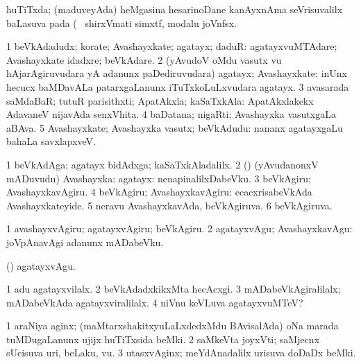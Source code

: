 \bentry
{}
\gl{\gu}
\bmng
huTiTxda; (maduveyAda) heMgasina hesarinoDane kanAyxnAma seVrisuvalilx baLasuva pada (\udA\  shirxVmati simxtf, modalu joVnfsx. 
\emng
\eentry

\bentry
{}
\gl{\nA}
\bmng
\bnum
\num{1} beVkAdadudx; korate; Avashayxkate; agatayx; daduR:  agatayxvuMTAdare; Avashayxkate idadxre; beVkAdare. 
\num{2} (yAvudoV oMdu vasutx \mo vu hAjarAgiruvudara yA adanunx paDediruvudara) agatayx; Avashayxkate:  inUnx hecucx baMDavALa patarxgaLanunx iTuTxkoLuLxvudara agatayx. 
\num{3} avasarada saMdaBaR; tutuR parisithxti; ApatAkxla; kaSaTxkAla:  ApatAkxlakekx AdavaneV nijavAda senxVhita. 
\num{4} baDatana; nigaRti; Avashayxka vasutxgaLa aBAva. 
\num{5} Avashayxkate; Avashayxka vasutx; beVkAdudu:  nananx agatayxgaLu bahaLa savxlapxveV. 
\enum
\emng

\noindent
\gl{\pagu}
\bmng
\bnum
\num{1}  beVkAdAga; agatayx bidAdxga; kaSaTxkAladalilx. 
\num{2}  (\pArxparx) (yAvudanonxV mADuvudu) Avashayxka: agatayx:  nenapinalilxDabeVku. 
\num{3}  beVkAgiru; AvashayxkavAgiru. 
\num{4}  beVkAgiru; AvashayxkavAgiru:  ecacxrisabeVkAda Avashayxkateyide. 
\num{5}  neravu AvashayxkavAda, beVkAgiruva. 
\num{6}  beVkAgiruva. 
\enum
\emng
\eentry

\bentry
{}
\gl{\sakirx}
\bmng
\bnum
\num{1} avashayxvAgiru; agatayxvAgiru; beVkAgiru. 
\num{2} agatayxvAgu; AvashayxkavAgu:  joVpAnavAgi adanunx mADabeVku. 
\enum
\emng

\noindent
\gl{\akirx}
\bmng
(\pArxparx) agatayxvAgu. 
\emng

\noindent
\gl{\pagu}
\bmng
\bnum
\num{1}  adu agatayxvilalx. 
\num{2}  beVkAdadxkikxMta hecAcxgi. 
\num{3}  mADabeVkAgiralilalx; mADabeVkAda agatayxviralilalx. 
\num{4}  niVnu keVLuva agatayxvuMTeV? 
\enum
\emng
\eentry

\bentry
{}
\gl{\nA}
\bmng
\bnum
\num{1} araNiya aginx; (maMtarxshakitxyuLaLxdedxMdu BAvisalAda) oNa marada tuMDugaLanunx ujijx huTiTxsida beMki. 
\num{2} saMkeVta joyxVti; saMjecnx sUcisuva uri, beLaku, \mo vu. 
\num{3} utasxvAginx; meYdAnadalilx urisuva doDaDx beMki. 
\enum
\emng
\eentry


